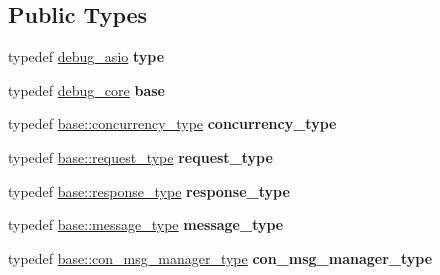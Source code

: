 \subsection*{Public Types}
\begin{DoxyCompactItemize}
\item 
typedef \hyperlink{structwebsocketpp_1_1config_1_1debug__asio}{debug\+\_\+asio} {\bfseries type}\hypertarget{structwebsocketpp_1_1config_1_1debug__asio_a10a7037cdb25a39e64780105e83147d0}{}\label{structwebsocketpp_1_1config_1_1debug__asio_a10a7037cdb25a39e64780105e83147d0}

\item 
typedef \hyperlink{structwebsocketpp_1_1config_1_1debug__core}{debug\+\_\+core} {\bfseries base}\hypertarget{structwebsocketpp_1_1config_1_1debug__asio_ae2b3c4a01c27b2f26bc98419543744cd}{}\label{structwebsocketpp_1_1config_1_1debug__asio_ae2b3c4a01c27b2f26bc98419543744cd}

\item 
typedef \hyperlink{classwebsocketpp_1_1concurrency_1_1basic}{base\+::concurrency\+\_\+type} {\bfseries concurrency\+\_\+type}\hypertarget{structwebsocketpp_1_1config_1_1debug__asio_ad3c746d7e71d7414c054a254418b93d1}{}\label{structwebsocketpp_1_1config_1_1debug__asio_ad3c746d7e71d7414c054a254418b93d1}

\item 
typedef \hyperlink{classwebsocketpp_1_1http_1_1parser_1_1request}{base\+::request\+\_\+type} {\bfseries request\+\_\+type}\hypertarget{structwebsocketpp_1_1config_1_1debug__asio_a4e52af4648f2afcd527b3e5587d8c8ea}{}\label{structwebsocketpp_1_1config_1_1debug__asio_a4e52af4648f2afcd527b3e5587d8c8ea}

\item 
typedef \hyperlink{classwebsocketpp_1_1http_1_1parser_1_1response}{base\+::response\+\_\+type} {\bfseries response\+\_\+type}\hypertarget{structwebsocketpp_1_1config_1_1debug__asio_ac59f3572fc37e0ebe1ffbfcd4d4f006b}{}\label{structwebsocketpp_1_1config_1_1debug__asio_ac59f3572fc37e0ebe1ffbfcd4d4f006b}

\item 
typedef \hyperlink{classwebsocketpp_1_1message__buffer_1_1message}{base\+::message\+\_\+type} {\bfseries message\+\_\+type}\hypertarget{structwebsocketpp_1_1config_1_1debug__asio_aaf34fbc85d12c93050cb41bc5c4cdbda}{}\label{structwebsocketpp_1_1config_1_1debug__asio_aaf34fbc85d12c93050cb41bc5c4cdbda}

\item 
typedef \hyperlink{classwebsocketpp_1_1message__buffer_1_1alloc_1_1con__msg__manager}{base\+::con\+\_\+msg\+\_\+manager\+\_\+type} {\bfseries con\+\_\+msg\+\_\+manager\+\_\+type}\hypertarget{structwebsocketpp_1_1config_1_1debug__asio_a81c47526ef346c02dd630dbb5ed7a81e}{}\label{structwebsocketpp_1_1config_1_1debug__asio_a81c47526ef346c02dd630dbb5ed7a81e}


\end{DoxyCompactItemize}
